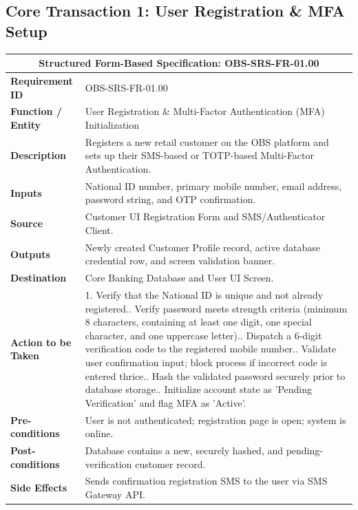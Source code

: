 \documentclass[11pt,a4paper]{article}
\begin{document}
\subsection{Core Transaction 1: User Registration \& MFA Setup}
\begin{center}
\small
\singlespacing
\begin{tabular}{p{4.0cm} p{11.0cm}}
\toprule
\multicolumn{2}{c}{\textbf{Structured Form-Based Specification: OBS-SRS-FR-01.00}} \\ \midrule
\textbf{Requirement ID} & OBS-SRS-FR-01.00 \\ \midrule
\textbf{Function / Entity} & User Registration \& Multi-Factor Authentication (MFA) Initialization \\ \midrule
\textbf{Description} & Registers a new retail customer on the OBS platform and sets up their SMS-based or TOTP-based Multi-Factor Authentication. \\ \midrule
\textbf{Inputs} & National ID number, primary mobile number, email address, password string, and OTP confirmation. \\ \midrule
\textbf{Source} & Customer UI Registration Form and SMS/Authenticator Client. \\ \midrule
\textbf{Outputs} & Newly created Customer Profile record, active database credential row, and screen validation banner. \\ \midrule
\textbf{Destination} & Core Banking Database and User UI Screen. \\ \midrule
\textbf{Action to be Taken} & 
1. Verify that the National ID is unique and not already registered.\newline
2. Verify password meets strength criteria (minimum 8 characters, containing at least one digit, one special character, and one uppercase letter).\newline
3. Dispatch a 6-digit verification code to the registered mobile number.\newline
4. Validate user confirmation input; block process if incorrect code is entered thrice.\newline
5. Hash the validated password securely prior to database storage.\newline
6. Initialize account state as 'Pending Verification' and flag MFA as 'Active'. \\ \midrule
\textbf{Pre-conditions} & User is not authenticated; registration page is open; system is online. \\ \midrule
\textbf{Post-conditions} & Database contains a new, securely hashed, and pending-verification customer record. \\ \midrule
\textbf{Side Effects} & Sends confirmation registration SMS to the user via SMS Gateway API. \\ \bottomrule
\end{tabular}
\end{center}
\end{document}
